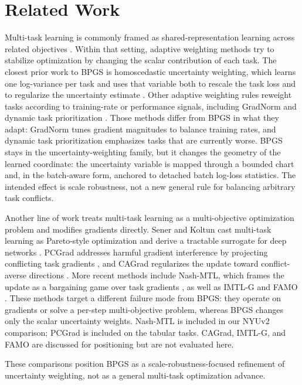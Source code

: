 \section{Related Work}
Multi-task learning is commonly framed as shared-representation learning across related objectives \cite{caruana1997multitask}. Within that setting, adaptive weighting methods try to stabilize optimization by changing the scalar contribution of each task. The closest prior work to BPGS is homoscedastic uncertainty weighting, which learns one log-variance per task and uses that variable both to rescale the task loss and to regularize the uncertainty estimate \cite{kendall2018}. Other adaptive weighting rules reweight tasks according to training-rate or performance signals, including GradNorm \cite{chen2018gradnorm} and dynamic task prioritization \cite{guo2018dtp}. Those methods differ from BPGS in what they adapt: GradNorm tunes gradient magnitudes to balance training rates, and dynamic task prioritization emphasizes tasks that are currently worse. BPGS stays in the uncertainty-weighting family, but it changes the geometry of the learned coordinate: the uncertainty variable is mapped through a bounded chart and, in the batch-aware form, anchored to detached batch log-loss statistics. The intended effect is scale robustness, not a new general rule for balancing arbitrary task conflicts.

Another line of work treats multi-task learning as a multi-objective optimization problem and modifies gradients directly. Sener and Koltun cast multi-task learning as Pareto-style optimization and derive a tractable surrogate for deep networks \cite{sener2018multiobjective}. PCGrad addresses harmful gradient interference by projecting conflicting task gradients \cite{yu2020pcgrad}, and CAGrad regularizes the update toward conflict-averse directions \cite{liu2021cagrad}. More recent methods include Nash-MTL, which frames the update as a bargaining game over task gradients \cite{navon2022nash}, as well as IMTL-G \cite{liu2021imtl} and FAMO \cite{liu2023famo}. These methods target a different failure mode from BPGS: they operate on gradients or solve a per-step multi-objective problem, whereas BPGS changes only the scalar uncertainty weights. Nash-MTL is included in our NYUv2 comparison; PCGrad is included on the tabular tasks. CAGrad, IMTL-G, and FAMO are discussed for positioning but are not evaluated here.

These comparisons position BPGS as a scale-robustness-focused refinement of uncertainty weighting,
not as a general multi-task optimization advance.
